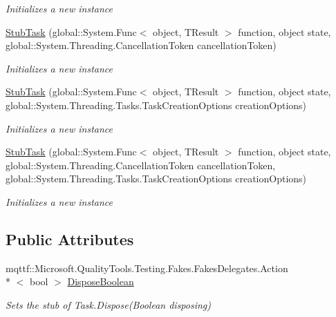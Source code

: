 \begin{DoxyCompactItemize}
\begin{DoxyCompactList}\small\item\em Initializes a new instance\end{DoxyCompactList}\item 
\hyperlink{class_system_1_1_threading_1_1_tasks_1_1_fakes_1_1_stub_task_3_01_t_result_01_4_af69395c66771c4968068b6aeb7294d90}{Stub\-Task} (global\-::\-System.\-Func$<$ object, T\-Result $>$ function, object state, global\-::\-System.\-Threading.\-Cancellation\-Token cancellation\-Token)
\begin{DoxyCompactList}\small\item\em Initializes a new instance\end{DoxyCompactList}\item 
\hyperlink{class_system_1_1_threading_1_1_tasks_1_1_fakes_1_1_stub_task_3_01_t_result_01_4_ad9a14a1105fae04c399e440e63d33659}{Stub\-Task} (global\-::\-System.\-Func$<$ object, T\-Result $>$ function, object state, global\-::\-System.\-Threading.\-Tasks.\-Task\-Creation\-Options creation\-Options)
\begin{DoxyCompactList}\small\item\em Initializes a new instance\end{DoxyCompactList}\item 
\hyperlink{class_system_1_1_threading_1_1_tasks_1_1_fakes_1_1_stub_task_3_01_t_result_01_4_a22f40ea59b6d1f08f8cc3f6262b951ff}{Stub\-Task} (global\-::\-System.\-Func$<$ object, T\-Result $>$ function, object state, global\-::\-System.\-Threading.\-Cancellation\-Token cancellation\-Token, global\-::\-System.\-Threading.\-Tasks.\-Task\-Creation\-Options creation\-Options)
\begin{DoxyCompactList}\small\item\em Initializes a new instance\end{DoxyCompactList}\end{DoxyCompactItemize}
\subsection*{Public Attributes}
\begin{DoxyCompactItemize}
\item 
mqttf\-::\-Microsoft.\-Quality\-Tools.\-Testing.\-Fakes.\-Fakes\-Delegates.\-Action\\*
$<$ bool $>$ \hyperlink{class_system_1_1_threading_1_1_tasks_1_1_fakes_1_1_stub_task_3_01_t_result_01_4_ac14223ce2c091c8b583706454a4a01ed}{Dispose\-Boolean}
\begin{DoxyCompactList}\small\item\em Sets the stub of Task.\-Dispose(\-Boolean disposing)\end{DoxyCompactList}\end{DoxyCompactItemize}
